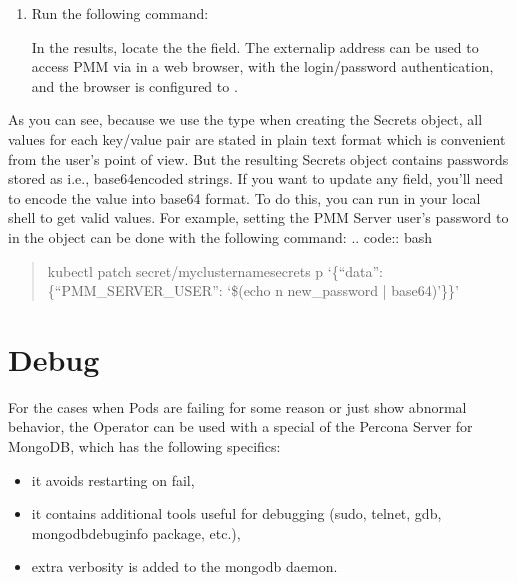 \documentclass[letterpaper,10pt,english]{sphinxmanual}
\begin{document}
\begin{enumerate}
\item {} 
Run the following command:


In the results, locate the the  field. The external\sphinxhyphen{}ip address
can be used to access PMM via  in a web browser, with the
login/password authentication, and the browser is configured to .

\end{enumerate}

As you can see, because we use the  type when creating the Secrets
object, all values for each key/value pair are stated in plain text format
which is convenient from the user’s point of view. But the resulting Secrets
object contains passwords stored as  \sphinxhyphen{} i.e., base64\sphinxhyphen{}encoded strings.
If you want to update any field, you’ll need to encode the value into base64
format. To do this, you can run  in your local
shell to get valid values. For example, setting the PMM Server user’s password
to  in the  object can be done
with the following command:
.. code:: bash
\begin{quote}

kubectl patch secret/my\sphinxhyphen{}cluster\sphinxhyphen{}name\sphinxhyphen{}secrets \sphinxhyphen{}p ‘\{“data”:\{“PMM\_SERVER\_USER”: ‘\$(echo \sphinxhyphen{}n new\_password | base64)’\}\}’
\end{quote}


\chapter{Debug}
\label{\detokenize{debug:debug}}\label{\detokenize{debug:debug-images}}\label{\detokenize{debug::doc}}
For the cases when Pods are failing for some reason or just show abnormal behavior,
the Operator can be used with a special  of the Percona Server for
MongoDB, which has the following specifics:
\begin{itemize}
\item {} 
it avoids restarting on fail,

\item {} 
it contains additional tools useful for debugging (sudo, telnet, gdb, mongodb\sphinxhyphen{}debuginfo package, etc.),

\item {} 
extra verbosity is added to the mongodb daemon.

\end{itemize}
\end{document}

